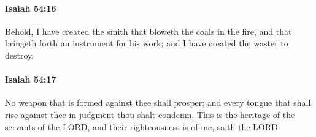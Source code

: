 		\paragraph{Isaiah 54:16} %
			\label{ISAIAH-54-16}

			Behold, I have created the smith that bloweth the coals in the fire, and that bringeth forth an instrument for his work; and I have created the waster to destroy.


		\paragraph{Isaiah 54:17} %
			\label{ISAIAH-54-17}

			No weapon that is formed against thee shall prosper; and every tongue that shall rise against thee in judgment thou shalt condemn. This is the heritage of the servants of the LORD, and their righteousness is of me, saith the LORD.

